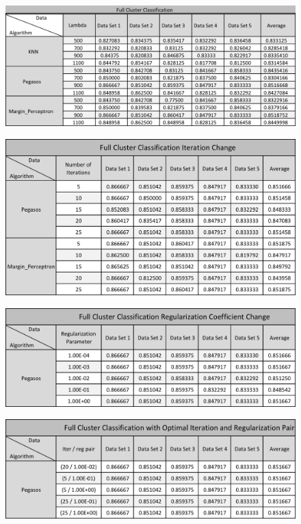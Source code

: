 \documentclass[11pt,letterpaper]{article}
\begin{document}
\begin{figure}
  \includegraphics[width=\linewidth]{data_4.png}
  \label{fig:data_4}
\end{figure}

\begin{figure}
  \includegraphics[width=\linewidth]{data_5.png}
  \label{fig:data_5}
\end{figure}

\begin{figure}
  \includegraphics[width=\linewidth]{data_6.png}
  \label{fig:data_6}
\end{figure}

\begin{figure}
  \includegraphics[width=\linewidth]{data_7.png}
  \label{fig:data_7}
\end{figure}
\end{document}
